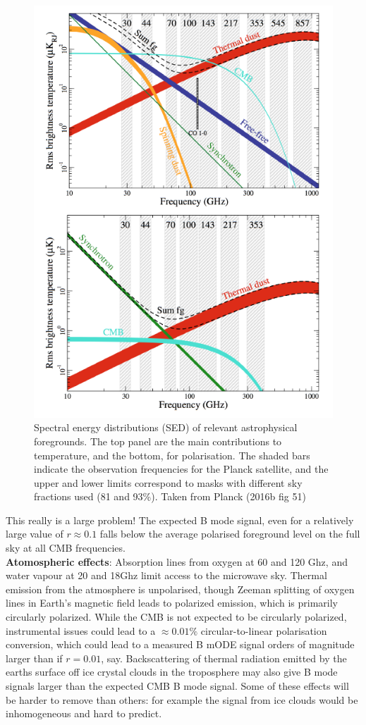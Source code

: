 \documentclass[a4paper,10pt]{article}
\begin{document}
\begin{figure}[h]
  \includegraphics[width=0.5\linewidth]{foregrounds.png}
  \caption{Spectral energy distributions (SED) of relevant astrophysical foregrounds. The top panel are the main contributions to temperature, and the bottom, for polarisation. The shaded bars indicate the observation frequencies for the Planck satellite, and the upper and lower limits correspond to masks with different sky fractions used (81 and 93\%). Taken from Planck (2016b fig 51) }
  \label{foregrounds}
\end{figure}

This really is a large problem! The expected B mode signal, even for a relatively large value of $r\approx0.1$ falls below the average polarised foreground level on the full sky at all CMB frequencies.  \\

\textbf{Atomospheric effects}: Absorption lines from oxygen at 60 and 120 Ghz, and water vapour at 20 and 18Ghz limit access to the microwave sky. Thermal emission from the atmosphere is unpolarised, though Zeeman splitting of oxygen lines in Earth's magnetic field leads to polarized emission, which is primarily circularly polarized. While the CMB is not expected to be circularly polarized, instrumental issues could lead to a $\approx 0.01\%$ circular-to-linear polarisation conversion, which could lead to a measured B mODE signal orders of magnitude larger than if $r=0.01$, say. Backscattering of thermal radiation emitted by the earths surface off ice  crystal clouds in the troposphere may also give B mode signals larger than the expected CMB B mode signal. Some of these effects will be harder to remove than others: for example the signal from ice clouds would be inhomogeneous and hard to predict.\\
\end{document}
